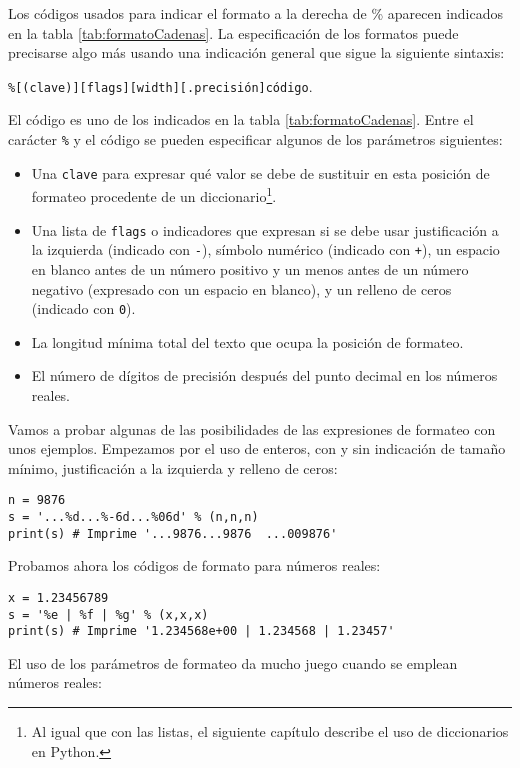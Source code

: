 Los códigos usados para indicar el formato a la derecha de \% aparecen indicados en la tabla \ref{tab:formatoCadenas}. La especificación de los formatos puede precisarse algo más usando una indicación general que sigue la siguiente sintaxis:

\texttt{\%[(clave)][flags][width][.precisión]código}. 

El código es uno de los indicados en la tabla \ref{tab:formatoCadenas}. Entre el carácter \texttt{\%} y el código se pueden especificar algunos de los parámetros siguientes:
\begin{itemize}
	\item Una \texttt{clave} para expresar qué valor se debe de sustituir en esta posición de formateo procedente de un diccionario\footnote{Al igual que con las listas, el siguiente capítulo describe el uso de diccionarios en Python.}. 
	\item Una lista de \texttt{flags} o indicadores que expresan si se debe usar justificación a la izquierda (indicado con \texttt{-}), símbolo numérico (indicado con \texttt{+}), un espacio en blanco antes de un número positivo y un menos antes de un número negativo (expresado con un espacio en blanco), y un relleno de ceros (indicado con \texttt{0}).
	\item La longitud mínima total del texto que ocupa la posición de formateo.
	\item El número de dígitos de precisión después del punto decimal en los números reales.
\end{itemize}

Vamos a probar algunas de las posibilidades de las expresiones de formateo con unos ejemplos. Empezamos por el uso de enteros, con y sin indicación de tamaño mínimo, justificación a la izquierda y relleno de ceros:

\begin{lstlisting}
n = 9876
s = '...%d...%-6d...%06d' % (n,n,n)
print(s) # Imprime '...9876...9876  ...009876'
\end{lstlisting}

Probamos ahora los códigos de formato para números reales:

\begin{lstlisting}
x = 1.23456789
s = '%e | %f | %g' % (x,x,x)
print(s) # Imprime '1.234568e+00 | 1.234568 | 1.23457'
\end{lstlisting}

El uso de los parámetros de formateo da mucho juego cuando se emplean números reales:

